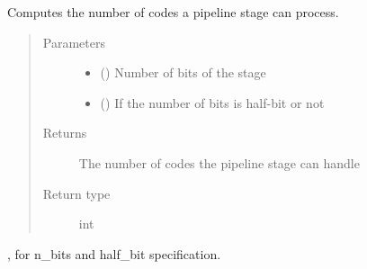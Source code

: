 \documentclass[letterpaper,10pt,english]{sphinxmanual}
\begin{document}

\begin{fulllineitems}
\label{\detokenize{gen:calib.gen.compute_n_codes}}
Computes the number of codes a pipeline stage can process.
\begin{quote}\begin{description}
\item[{Parameters}] \leavevmode\begin{itemize}
\item {} 
 (\sphinxstyleliteralemphasis{\sphinxupquote{, }}\sphinxstyleliteralemphasis{\sphinxupquote{, }}) \textendash{} Number of bits of the stage

\item {} 
 () \textendash{} If the number of bits is half-bit or not

\end{itemize}

\item[{Returns}] \leavevmode
The number of codes the pipeline stage can handle

\item[{Return type}] \leavevmode
int

\end{description}\end{quote}




{\hyperref[\detokenize{gen:calib.gen.parse_bits}]{}}, for n\_bits and half\_bit specification.



\end{fulllineitems}

\end{document}
